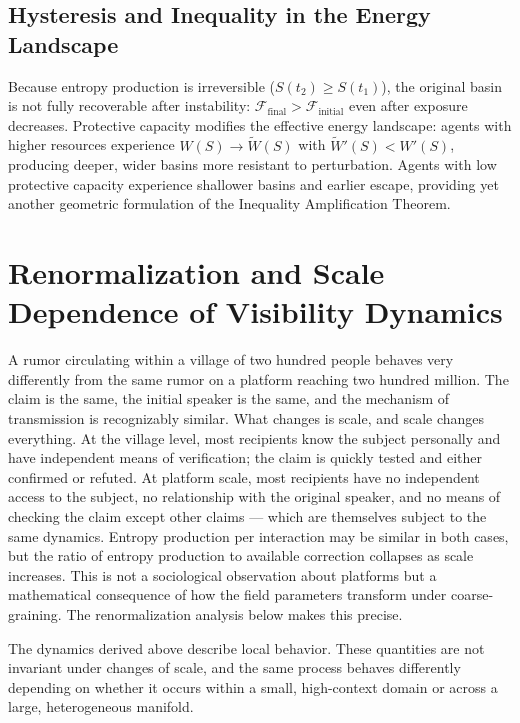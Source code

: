\documentclass[12pt,a4paper]{article}
\begin{document}
\subsection{Hysteresis and Inequality in the Energy Landscape}

Because entropy production is irreversible ($S(t_2) \geq S(t_1)$), the original basin is not fully recoverable after instability: $\mathcal{F}_{\text{final}} > \mathcal{F}_{\text{initial}}$ even after exposure decreases. Protective capacity modifies the effective energy landscape: agents with higher resources experience $W(S) \to \tilde{W}(S)$ with $\tilde{W}'(S) < W'(S)$, producing deeper, wider basins more resistant to perturbation. Agents with low protective capacity experience shallower basins and earlier escape, providing yet another geometric formulation of the Inequality Amplification Theorem.

\clearpage
\section{Renormalization and Scale Dependence of Visibility Dynamics}

A rumor circulating within a village of two hundred people behaves very differently from the same rumor on a platform reaching two hundred million. The claim is the same, the initial speaker is the same, and the mechanism of transmission is recognizably similar. What changes is scale, and scale changes everything. At the village level, most recipients know the subject personally and have independent means of verification; the claim is quickly tested and either confirmed or refuted. At platform scale, most recipients have no independent access to the subject, no relationship with the original speaker, and no means of checking the claim except other claims — which are themselves subject to the same dynamics. Entropy production per interaction may be similar in both cases, but the ratio of entropy production to available correction collapses as scale increases. This is not a sociological observation about platforms but a mathematical consequence of how the field parameters transform under coarse-graining. The renormalization analysis below makes this precise.

The dynamics derived above describe local behavior. These quantities are not invariant under changes of scale, and the same process behaves differently depending on whether it occurs within a small, high-context domain or across a large, heterogeneous manifold.
\end{document}
